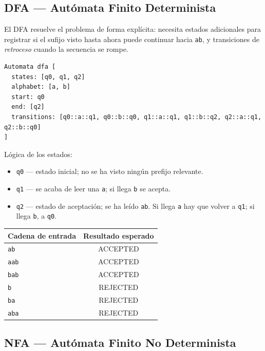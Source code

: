 \documentclass{article}
\begin{document}
\subsection{DFA — Autómata Finito Determinista}

El DFA resuelve el problema de forma explícita: necesita estados adicionales para
registrar si el sufijo visto hasta ahora puede continuar hacia \texttt{ab},
y transiciones de \emph{retroceso} cuando la secuencia se rompe.

\begin{verbatim}
Automata dfa [
  states: [q0, q1, q2]
  alphabet: [a, b]
  start: q0
  end: [q2]
  transitions: [q0::a::q1, q0::b::q0, q1::a::q1, q1::b::q2, q2::a::q1, q2::b::q0]
]
\end{verbatim}

\noindent Lógica de los estados:
\begin{itemize}
  \item \texttt{q0} — estado inicial; no se ha visto ningún prefijo relevante.
  \item \texttt{q1} — se acaba de leer una \texttt{a}; si llega \texttt{b} se acepta.
  \item \texttt{q2} — estado de aceptación; se ha leído \texttt{ab}.
        Si llega \texttt{a} hay que volver a \texttt{q1}; si llega \texttt{b}, a \texttt{q0}.
\end{itemize}

\begin{center}
\begin{tabular}{|l|c|}
\hline
\textbf{Cadena de entrada} & \textbf{Resultado esperado} \\
\hline
\texttt{ab}   & ACCEPTED \\
\texttt{aab}  & ACCEPTED \\
\texttt{bab}  & ACCEPTED \\
\texttt{b}    & REJECTED \\
\texttt{ba}   & REJECTED \\
\texttt{aba}  & REJECTED \\
\hline
\end{tabular}
\end{center}

\subsection{NFA — Autómata Finito No Determinista}
\end{document}
